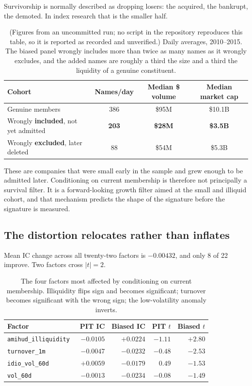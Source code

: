 \documentclass[11pt]{article}
\newcommand{\fac}[1]{\texttt{\small #1}}
\begin{document}
Survivorship is normally described as dropping losers: the acquired, the bankrupt, the
demoted. In index research that is the smaller half.

\begin{table}[h]
\centering
\small
\begin{tabular}{lccc}
\toprule
Cohort & Names/day & Median \$ volume & Median market cap \\
\midrule
Genuine members & 386 & \$95M & \$10.1B \\
Wrongly \textbf{included}, not yet admitted & \textbf{203} & \textbf{\$28M} & \textbf{\$3.5B} \\
Wrongly \textbf{excluded}, later deleted & 88 & \$54M & \$5.3B \\
\bottomrule
\end{tabular}
\caption{(Figures from an uncommitted run; no script in the repository reproduces this table, so it is reported as recorded and unverified.) Daily averages, 2010--2015. The biased panel wrongly includes more than twice as
many names as it wrongly excludes, and the added names are roughly a third the size and a
third the liquidity of a genuine constituent.}
\label{tab:cohorts}
\end{table}

These are companies that were small early in the sample and grew enough to be admitted
later. Conditioning on current membership is therefore not principally a survival filter.
It is a forward-looking growth filter aimed at the small and illiquid cohort, and that
mechanism predicts the shape of the signature before the signature is measured.

\subsection{The distortion relocates rather than inflates}

Mean IC change across all twenty-two factors is $-0.00432$, and only 8 of 22 improve.
Two factors cross $|t| = 2$.

\begin{table}[h]
\centering
\small
\begin{tabular}{lrrrr}
\toprule
Factor & PIT IC & Biased IC & PIT $t$ & Biased $t$ \\
\midrule
\fac{amihud\_illiquidity}~\cite{amihud2002} & $-0.0105$ & $\mathbf{+0.0224}$ & $-1.11$ & $\mathbf{+2.80}$ \\
\fac{turnover\_1m} & $-0.0047$ & $-0.0232$ & $-0.48$ & $\mathbf{-2.53}$ \\
\fac{idio\_vol\_60d}~\cite{ang2006} & $+0.0059$ & $-0.0179$ & $0.49$ & $-1.53$ \\
\fac{vol\_60d} & $-0.0013$ & $-0.0234$ & $-0.08$ & $-1.49$ \\
\bottomrule
\end{tabular}
\caption{The four factors most affected by conditioning on current membership.
Illiquidity flips sign and becomes significant; turnover becomes significant with the
wrong sign; the low-volatility anomaly inverts.}
\label{tab:surv}
\end{table}
\end{document}
